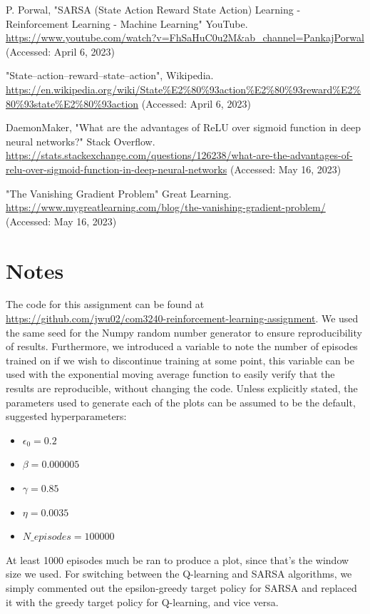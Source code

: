 \documentclass[conference]{IEEEtran}
\begin{document}
\newpage

\begin{thebibliography}{00}
 P. Porwal, "SARSA (State Action Reward State Action) Learning - Reinforcement Learning - Machine Learning" YouTube. \url{https://www.youtube.com/watch?v=FhSaHuC0u2M&ab_channel=PankajPorwal} (Accessed: April 6, 2023)

 "State–action–reward–state–action", Wikipedia. \url{https://en.wikipedia.org/wiki/State%E2%80%93action%E2%80%93reward%E2%80%93state%E2%80%93action} (Accessed: April 6, 2023)

 DaemonMaker, "What are the advantages of ReLU over sigmoid function in deep neural networks?" Stack Overflow. \url{https://stats.stackexchange.com/questions/126238/what-are-the-advantages-of-relu-over-sigmoid-function-in-deep-neural-networks} (Accessed: May 16, 2023)

 "The Vanishing Gradient Problem" Great Learning. \url{https://www.mygreatlearning.com/blog/the-vanishing-gradient-problem/} (Accessed: May 16, 2023)

\end{thebibliography}

\section*{Notes}
The code for this assignment can be found at \url{https://github.com/jwu02/com3240-reinforcement-learning-assignment}. We used the same seed for the Numpy random number generator to ensure reproducibility of results. Furthermore, we introduced a variable to note the number of episodes trained on if we wish to discontinue training at some point, this variable can be used with the exponential moving average function to easily verify that the results are reproducible, without changing the code. Unless explicitly stated, the parameters used to generate each of the plots can be assumed to be the default, suggested hyperparameters:
\begin{itemize}
    \item $\epsilon_0 = 0.2$
    \item $\beta = 0.000005$
    \item $\gamma = 0.85$
    \item $\eta = 0.0035$
    \item $N\_episodes = 100000$
\end{itemize}

At least 1000 episodes much be ran to produce a plot, since that's the window size we used. For switching between the Q-learning and SARSA algorithms, we simply commented out the epsilon-greedy target policy for SARSA and replaced it with the greedy target policy for Q-learning, and vice versa.
\end{document}
